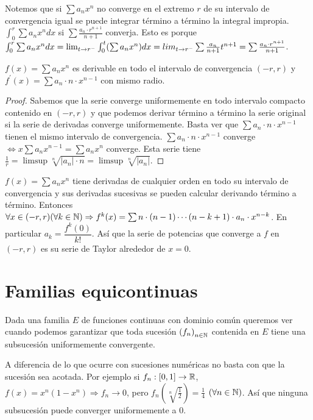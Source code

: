 Notemos que si \(\sum a_n x^n\) no converge en el extremo \(r\) de su intervalo de convergencia igual se puede integrar término a término la integral impropia.\( \int_0^r \sum a_n x^n dx\) si \(\sum \frac{a_n \cdot r^{n+1}}{n+1} \) converja.
Esto es porque \(\int_0^r \sum a_n x^n dx = \lim_{t \to r^-} \int_0^t (\sum a_n x^n) dx = \\lim_{t \to r^-} \sum \frac{a_n}{n+1} t^{n+1} = \sum \frac{a_n \cdot r^{n+1}}{n+1} \).

\begin{theorem}
  \(f(x) = \sum a_n x^n\) es derivable en todo el intervalo de convergencia \((-r, r)\) y \(f^{\prime}(x) = \sum a_n \cdot n \cdot x^{n-1} \) con mismo radio.
  \begin{proof}
    Sabemos que la serie converge uniformemente en todo intervalo compacto contenido en \((-r, r)\) y que podemos derivar término a término la serie original si la serie de derivadas converge uniformemente.
    Basta ver que \(\sum a_n \cdot n \cdot x^{n-1} \) tienen el mismo intervalo de convergencia. \(\sum a_n \cdot n \cdot x^{n-1} \) converge \(\iff x \sum a_n x^{n-1} = \sum a_n x^n\) converge. Esta serie tiene \(\frac{1}{r} = \limsup \sqrt[n]{|a_n| \cdot n} = \limsup \sqrt[n]{|a_n|} \).
  \end{proof}
\end{theorem}

\begin{corollary}
  \(f(x) = \sum a_n x^n\) tiene derivadas de cualquier orden en todo su intervalo de convergencia y sus derivadas sucesivas se pueden calcular derivando término a término. Entonces \(\forall x \in (-r, r)(\forall k \in \mathbb{N}) \Rightarrow f^k(x) = \sum n \cdot (n-1) \cdots (n-k+1) \cdot a_n \cdot x^{n-k} \).
  En particular \(a_k = \dfrac{f^k(0)}{k!} \). Así que la serie de potencias que converge a \(f\) en \((-r, r)\) es su serie de Taylor alrededor de \(x = 0\).
\end{corollary}

\section{Familias equicontinuas}

Dada una familia \(E\) de funciones continuas con dominio común queremos ver cuando podemos garantizar que toda sucesión \({(f_n)}_{n \in \mathbb{N}} \) contenida en \(E\) tiene una subsucesión uniformemente convergente.

A diferencia de lo que ocurre con sucesiones numéricas no basta con que la sucesión sea acotada. Por ejemplo si \(f_n: [0, 1] \to \mathbb{R} \), \(f(x) = x^n(1 - x^n) \Rightarrow f_n \to 0\), pero \(f_n(\sqrt[n]{\frac{1}{2}}) = \frac{1}{4} \) \((\forall n \in \mathbb{N})\).
Así que ninguna subsucesión puede converger uniformemente a \(0\).

